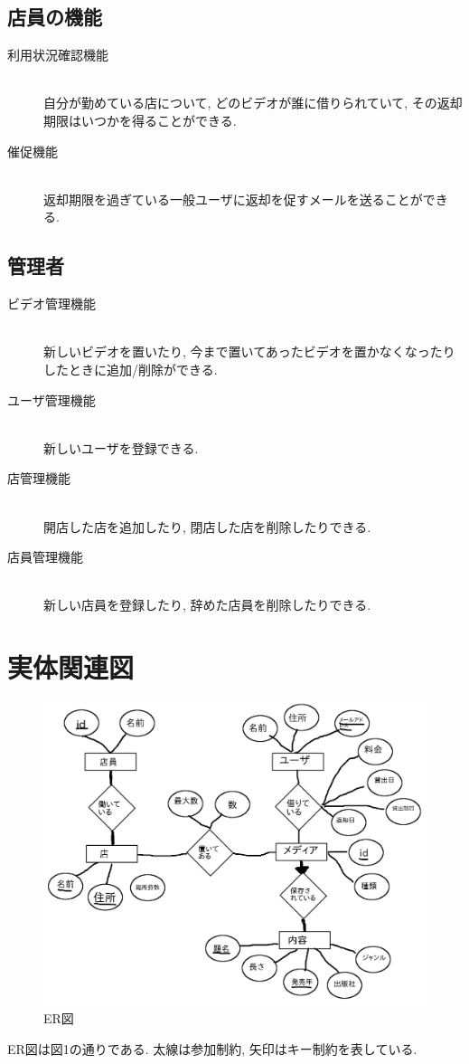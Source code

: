 \documentclass{jarticle}
\begin{document}
\subsection{店員の機能}
\begin{description}
\item[利用状況確認機能] \leavevmode \\
自分が勤めている店について, どのビデオが誰に借りられていて, その返却期限はいつかを得ることができる.
\item[催促機能] \leavevmode \\
返却期限を過ぎている一般ユーザに返却を促すメールを送ることができる.
\end{description}
\subsection{管理者}
\begin{description}
\item[ビデオ管理機能] \leavevmode \\
新しいビデオを置いたり, 今まで置いてあったビデオを置かなくなったりしたときに追加/削除ができる.
\item[ユーザ管理機能] \leavevmode \\
新しいユーザを登録できる.
\item[店管理機能] \leavevmode \\
開店した店を追加したり, 閉店した店を削除したりできる.
\item[店員管理機能] \leavevmode \\
新しい店員を登録したり, 辞めた店員を削除したりできる.
\end{description}
\section{実体関連図}
\begin{figure}[htbp]
    \centering
    \caption{ER図}
    \includegraphics[width=15cm]{er.png}
\end{figure}
ER図は図1の通りである. 太線は参加制約, 矢印はキー制約を表している.
\end{document}
